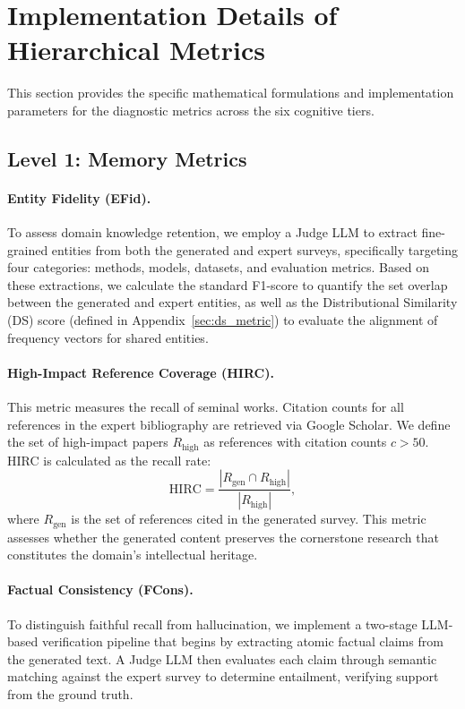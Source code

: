 \documentclass[11pt]{article}
\begin{document}
\section{Implementation Details of Hierarchical Metrics}
\label{sec:appendix_hm}

This section provides the specific mathematical formulations and implementation parameters for the diagnostic metrics across the six cognitive tiers.

\subsection{Level 1: Memory Metrics}

\paragraph{Entity Fidelity (EFid).}
To assess domain knowledge retention, we employ a Judge LLM to extract fine-grained entities from both the generated and expert surveys, specifically targeting four categories: methods, models, datasets, and evaluation metrics. Based on these extractions, we calculate the standard F1-score to quantify the set overlap between the generated and expert entities, as well as the Distributional Similarity (DS) score (defined in Appendix~\ref{sec:ds_metric}) to evaluate the alignment of frequency vectors for shared entities.

\paragraph{High-Impact Reference Coverage (HIRC).}
This metric measures the recall of seminal works. Citation counts for all references in the expert bibliography are retrieved via Google Scholar. We define the set of high-impact papers $R_{\text{high}}$ as references with citation counts $c > 50$. HIRC is calculated as the recall rate:
{
\setlength{\abovedisplayskip}{3pt}
\setlength{\belowdisplayskip}{3pt}
\begin{equation}
    \text{HIRC} = \frac{|R_{\text{gen}} \cap R_{\text{high}}|}{|R_{\text{high}}|},
\end{equation}
}
where $R_{\text{gen}}$ is the set of references cited in the generated survey. This metric assesses whether the generated content preserves the cornerstone research that constitutes the domain's intellectual heritage.

\paragraph{Factual Consistency (FCons).} To distinguish faithful recall from hallucination, we implement a two-stage LLM-based verification pipeline that begins by extracting atomic factual claims from the generated text. A Judge LLM then evaluates each claim through semantic matching against the expert survey to determine entailment, verifying support from the ground truth. 
\end{document}
